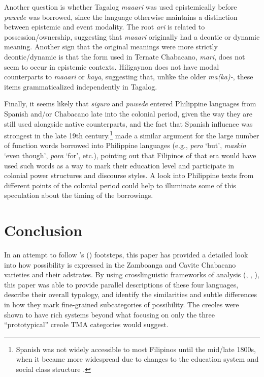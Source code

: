 \documentclass[output=paper,colorlinks,citecolor=brown]{langscibook}
\begin{document}
Another question is whether Tagalog \textit{maaari} was used epistemically before \textit{puwede} was borrowed, since the language otherwise maintains a distinction between epistemic and event modality. The root \textit{ari} is related to possession/ownership, suggesting that \textit{maaari} originally had a deontic or dynamic meaning. Another sign that the original meanings were more strictly deontic/dynamic is that the form used in Ternate Chabacano, \textit{mari}, does not seem to occur in epistemic contexts. Hiligaynon does not have modal counterparts to \textit{maaari} or \textit{kaya}, suggesting that, unlike the older \textit{ma(ka)-}, these items grammaticalized independently in Tagalog. 

Finally, it seems likely that \textit{siguro} and \textit{puwede} entered Philippine languages from Spanish and/or Chabacano late into the colonial period, given the way they are still used alongside native counterparts, and the fact that Spanish influence was strongest in the late 19th century.\footnote{Spanish was not widely accessible to most Filipinos until the mid/late 1800s, when it became more widespread due to changes to the education system and social class structure \citep[5]{Lesho2018}.}  \citet[151--152]{Stolz2002} made a similar argument for the large number of function words borrowed into Philippine languages (e.g., \textit{pero} ‘but', \textit{maskin} ‘even though', \textit{para} ‘for', etc.), pointing out that Filipinos of that era would have used such words as a way to mark their education level and participate in colonial power structures and discourse styles. A look into Philippine texts from different points of the colonial period could help to illuminate some of this speculation about the timing of the borrowings.

\section{Conclusion}

In an attempt to follow \citeauthor{Winford2000_irrealis}'s (\citeyear{Winford2000_irrealis, Winford2018}) footsteps, this paper has provided a detailed look into how possibility is expressed in the Zamboanga and Cavite Chabacano varieties and their adstrates. By using crosslinguistic frameworks of analysis (\citealt{vanderAuweraPlungian1998}, \citealt{Palmer2001}, \citealt{MatthewsonDavis2005}), this paper was able to provide parallel descriptions of these four languages, describe their overall typology, and identify the similarities and subtle differences in how they mark fine-grained subcategories of possibility. The creoles were shown to have rich systems beyond what focusing on only the three “prototypical” creole TMA categories would suggest. 
\end{document}
